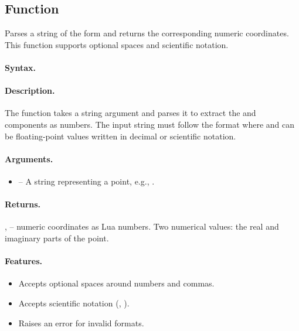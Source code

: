 \subsection{Function }
\label{sub:function_utils_parse_point}

Parses a string of the form  and returns the corresponding numeric coordinates. This function supports optional spaces and scientific notation.

\paragraph{Syntax.}
\begin{center}
\end{center}

\paragraph{Description.}
The function takes a string argument and parses it to extract the  and  components as numbers. The input string must follow the format  where  and  can be floating-point values written in decimal or scientific notation.

\paragraph{Arguments.}
\begin{itemize}
\item {} – A string representing a point, e.g., .
\end{itemize}

\paragraph{Returns.}
,  – numeric coordinates as Lua numbers.
Two numerical values: the real and imaginary parts of the point.

\paragraph{Features.}
\begin{itemize}
\item Accepts optional spaces around numbers and commas.
\item Accepts scientific notation (, ).
\item Raises an error for invalid formats.
\end{itemize}


